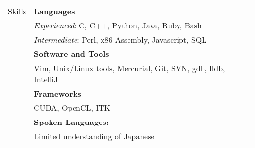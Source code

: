 \documentclass[11pt]{article}
\begin{document}
\begin{tabular}{p{0.75in} p{5.45in}}
        

    {Skills} &
        \textbf{Languages} \\ &
        \qquad \textit{Experienced}: C, C++, Python, Java, Ruby, Bash \\ &
        \qquad \textit{Intermediate}: Perl, x86 Assembly, Javascript, SQL \\ & \vspace{0.015in}
        \textbf{Software and Tools} \\ &
        \qquad Vim, Unix/Linux tools, Mercurial, Git, SVN, gdb, lldb, IntelliJ \\ & \vspace{0.015in}
        \textbf{Frameworks} \\ &
        \qquad CUDA, OpenCL, ITK \\ & \vspace{0.015in}
        \textbf{Spoken Languages:} \\ &
        \qquad Limited understanding of Japanese \\
\end{tabular}
\end{document}
